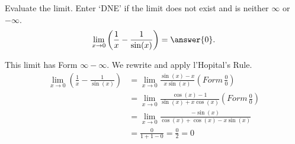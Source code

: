 \documentclass{ximera}
\author{Emma Smith Zbarsky \and Bobby Ramsey}
\begin{document}
\begin{exercise}

Evaluate the limit. Enter `DNE' if the limit does not exist and is neither $\infty$ or $-\infty$.  
\[\lim_{x \to 0} \left(\frac{1}{x} - \frac{1}{\sin(x)}\right) = \answer{0}.\]




\begin{hint}
This limit has Form $\infty - \infty$. We rewrite and apply l'Hopital's Rule.
\begin{align*}
	\lim_{x\to 0} \left(\frac{1}{x} - \frac{1}{\sin(x)} \right)&= \lim_{x\to 0} \frac{\sin(x)-x}{x\sin(x)} \left(Form \, \frac{0}{0}\right) \\
	&= \lim_{x\to 0} \frac{\cos(x)-1}{\sin(x)+x\cos(x)} \left(Form \,  \frac{0}{0}\right) \\
	&= \lim_{x\to 0} \frac{-\sin(x)}{\cos(x)+\cos(x)-x\sin(x)} \\
	&= \frac{0}{1+1-0} = \frac{0}{2} = 0
\end{align*}
\end{hint}



\end{exercise}
\end{document}
